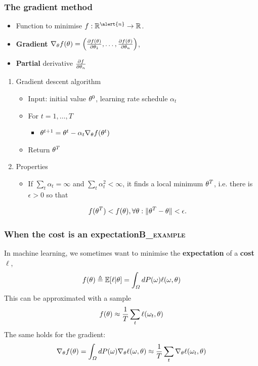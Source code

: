 \documentclass[smaller]{article}
\begin{document}
\subsubsection{The gradient method}
\label{sec:orgb933679}
\begin{itemize}
\item Function to minimise \(f : \Reals^{\alert{n}} \to \Reals\).
\item \textbf{Gradient} \(\nabla_\theta f(\theta)  = \left(\frac{\partial f(\theta)}{\partial \theta_1}, \ldots, \frac{\partial f(\theta)}{\partial \theta_n}\right)\),
\item \textbf{Partial} derivative \(\frac{\partial f}{\partial \theta_n}\)
\end{itemize}
\begin{enumerate}
\item Gradient descent algorithm
\label{sec:org3760df1}
\begin{itemize}
\item Input: initial value \(\theta^0\), learning rate schedule \(\alpha_t\)
\item For \(t=1, \ldots, T\)
\begin{itemize}
\item \(\theta^{t+1} = \theta^t - \alpha_t \nabla_\theta f(\theta^t)\)
\end{itemize}
\item Return \(\theta^T\)
\end{itemize}
\item Properties
\label{sec:org7976e1a}
\begin{itemize}
\item If \(\sum_t \alpha_t = \infty\) and \(\sum_t \alpha_t^2 < \infty\), it finds a local minimum \(\theta^T\), i.e. there is \(\epsilon > 0\) so that
\end{itemize}
\[
f(\theta^T) < f(\theta), \forall \theta: \|\theta^T - \theta\| < \epsilon.
\]
\end{enumerate}

\subsubsection{When the cost is an expectation\hfill{}\textsc{B\_example}}
\label{sec:org1cfa740}
In machine learning, we sometimes want to minimise the \textbf{expectation} of a \textbf{cost} \(\ell\), 
\[
f(\theta) \mathrel{\triangleq} \mathop{\mbox{\ensuremath{\mathbb{E}}}}\nolimits[\ell | \theta] = \int_\Omega dP(\omega) \ell(\omega, \theta)
\]
This can be approximated with a sample
\[
f(\theta) \approx \frac{1}{T} \sum_t \ell(\omega_t, \theta)
\]
The same holds for the gradient:
\[
\nabla_\theta f(\theta) = \int_\Omega dP(\omega) \nabla_\theta \ell(\omega, \theta)
\approx \frac{1}{T} \sum_t \nabla_\theta \ell(\omega_t, \theta)
\]
\end{document}
